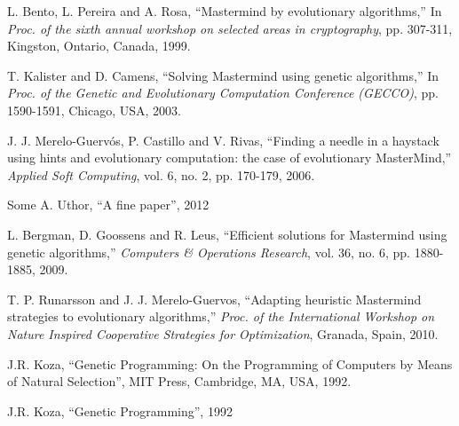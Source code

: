 \begin{thebibliography}{1}
L. Bento, L. Pereira and A. Rosa, ``Mastermind by evolutionary algorithms,'' In {\em Proc. of the sixth annual workshop on selected areas in cryptography}, pp. 307-311, Kingston, Ontario, Canada, 1999.

T. Kalister and D. Camens, ``Solving Mastermind using genetic algorithms,'' In {\em Proc. of the Genetic and Evolutionary Computation Conference (GECCO)}, pp. 1590-1591, Chicago, USA, 2003.

J. J. Merelo-Guerv\'os, P. Castillo and V. Rivas, ``Finding a needle in a haystack using hints and evolutionary computation: the case of evolutionary MasterMind,'' {\em Applied Soft Computing}, vol. 6, no. 2, pp. 170-179, 2006.

Some A. Uthor, ``A fine paper'', 2012

L. Bergman, D. Goossens and R. Leus, ``Efficient solutions for Mastermind using genetic algorithms,'' {\em Computers \& Operations Research}, vol. 36, no. 6, pp. 1880-1885, 2009.

T. P. Runarsson and J. J. Merelo-Guervos,
``Adapting heuristic Mastermind strategies to evolutionary algorithms,''
{\em Proc. of the International Workshop on Nature Inspired Cooperative Strategies for Optimization}, Granada, Spain, 2010.

%



J.R. Koza, ``Genetic Programming: On the Programming of Computers by Means of Natural Selection'', MIT Press, Cambridge, MA, USA, 1992.

J.R. Koza, ``Genetic Programming'', 1992

%
%


\end{thebibliography}
